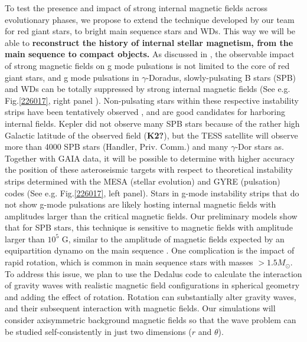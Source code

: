 To test the presence and impact of strong internal magnetic fields across evolutionary phases,
we propose to extend the technique developed by our team for red giant stars, to bright main sequence stars and WDs. This way we will be able to \textbf{reconstruct the history of internal stellar magnetism, from the main sequence to compact objects.} As discussed in \citet{Cantiello_2016}, the observable impact of strong magnetic fields on g mode pulsations is not limited to the core of red giant stars, and
 g mode pulsations in $\gamma$-Doradus, slowly-pulsating B stars (SPB) and WDs can be totally suppressed by strong internal magnetic fields (See e.g. Fig.\ref{226017}, right panel ).
Non-pulsating stars within these respective instability strips have been tentatively observed \citep{Balona_2011}, and are good candidates for harboring internal fields.
Kepler did not observe many SPB stars because of the rather high Galactic latitude of the observed field (\textbf{K2?}), but the TESS satellite will observe more than 4000 SPB stars (Handler, Priv. Comm.) and many $\gamma$-Dor stars as.  
Together with GAIA data, it will be possible to determine with higher accuracy the position of these asteroseismic targets with respect to
theoretical instability strips determined with the MESA (stellar evolution) and GYRE (pulsation) codes (See e.g. Fig.\ref{226017}, left panel).
Stars in g-mode instability strips that do not show g-mode pulsations are likely hosting internal magnetic fields with amplitudes larger than the critical
magnetic fields. Our preliminary models show that for SPB stars, this technique is sensitive to magnetic fields with amplitude larger than $10^5$ G,
similar to the amplitude of magnetic fields expected by an equipartition dynamo on the main sequence \citep[See e.g.][]{Featherstone_2009,Augustson_2016}.
One complication is the impact of rapid rotation, which is common in main sequence stars with masses $> 1.5M_\odot$. To address this issue,
we plan to use the Dedalus code to calculate the interaction of gravity waves with realistic magnetic field configurations in spherical geometry \citep[e.g.][]{Braithwaite_2006} 
and adding the effect of rotation. Rotation can substantially alter gravity waves, and their subsequent interaction with magnetic fields. Our simulations will consider axisymmetric background magnetic fields so that the wave problem can be studied self-consistently in just two dimensions ($r$ and $\theta$). 